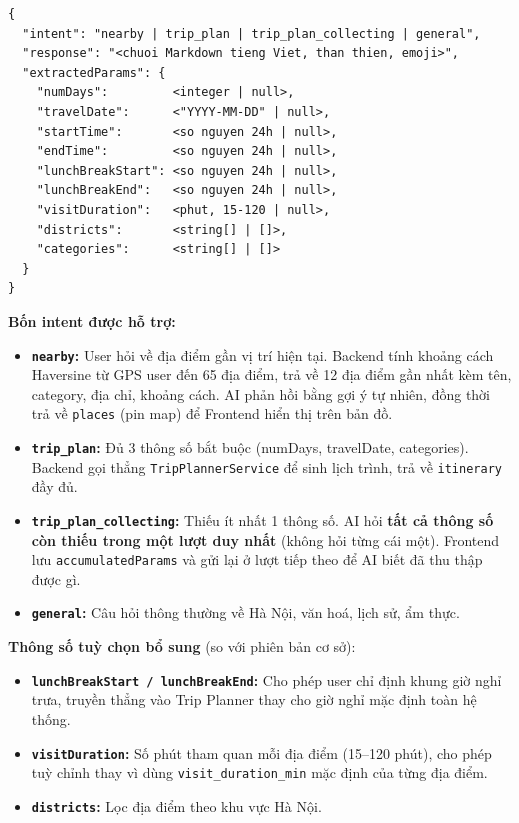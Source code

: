 \documentclass[12pt,a4paper]{article}
\begin{document}
\begin{lstlisting}[language={}]
{
  "intent": "nearby | trip_plan | trip_plan_collecting | general",
  "response": "<chuoi Markdown tieng Viet, than thien, emoji>",
  "extractedParams": {
    "numDays":         <integer | null>,
    "travelDate":      <"YYYY-MM-DD" | null>,
    "startTime":       <so nguyen 24h | null>,
    "endTime":         <so nguyen 24h | null>,
    "lunchBreakStart": <so nguyen 24h | null>,
    "lunchBreakEnd":   <so nguyen 24h | null>,
    "visitDuration":   <phut, 15-120 | null>,
    "districts":       <string[] | []>,
    "categories":      <string[] | []>
  }
}
\end{lstlisting}

\textbf{Bốn intent được hỗ trợ:}

\begin{itemize}
  \item \textbf{\texttt{nearby}:} User hỏi về địa điểm gần vị trí hiện tại.
        Backend tính khoảng cách Haversine từ GPS user đến 65 địa điểm, trả
        về 12 địa điểm gần nhất kèm tên, category, địa chỉ, khoảng cách.
        AI phản hồi bằng gợi ý tự nhiên, đồng thời trả về \texttt{places}
        (pin map) để Frontend hiển thị trên bản đồ.
  \item \textbf{\texttt{trip\_plan}:} Đủ 3 thông số bắt buộc (numDays,
        travelDate, categories). Backend gọi thẳng \texttt{TripPlannerService}
        để sinh lịch trình, trả về \texttt{itinerary} đầy đủ.
  \item \textbf{\texttt{trip\_plan\_collecting}:} Thiếu ít nhất 1 thông số.
        AI hỏi \textbf{tất cả thông số còn thiếu trong một lượt duy nhất}
        (không hỏi từng cái một). Frontend lưu \texttt{accumulatedParams} và
        gửi lại ở lượt tiếp theo để AI biết đã thu thập được gì.
  \item \textbf{\texttt{general}:} Câu hỏi thông thường về Hà Nội, văn hoá,
        lịch sử, ẩm thực.
\end{itemize}

\textbf{Thông số tuỳ chọn bổ sung} (so với phiên bản cơ sở):

\begin{itemize}
  \item \textbf{\texttt{lunchBreakStart / lunchBreakEnd}:} Cho phép user chỉ
        định khung giờ nghỉ trưa, truyền thẳng vào Trip Planner thay cho
        giờ nghỉ mặc định toàn hệ thống.
  \item \textbf{\texttt{visitDuration}:} Số phút tham quan mỗi địa điểm
        (15--120 phút), cho phép tuỳ chỉnh thay vì dùng
        \texttt{visit\_duration\_min} mặc định của từng địa điểm.
  \item \textbf{\texttt{districts}:} Lọc địa điểm theo khu vực Hà Nội.
\end{itemize}
\end{document}
